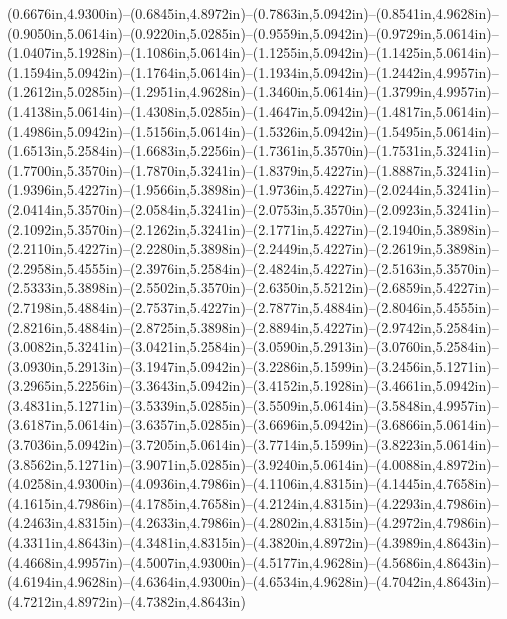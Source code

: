(0.6676in,4.9300in)--(0.6845in,4.8972in)--(0.7863in,5.0942in)--(0.8541in,4.9628in)--(0.9050in,5.0614in)--(0.9220in,5.0285in)--(0.9559in,5.0942in)--(0.9729in,5.0614in)--(1.0407in,5.1928in)--(1.1086in,5.0614in)--(1.1255in,5.0942in)--(1.1425in,5.0614in)--(1.1594in,5.0942in)--(1.1764in,5.0614in)--(1.1934in,5.0942in)--(1.2442in,4.9957in)--(1.2612in,5.0285in)--(1.2951in,4.9628in)--(1.3460in,5.0614in)--(1.3799in,4.9957in)--(1.4138in,5.0614in)--(1.4308in,5.0285in)--(1.4647in,5.0942in)--(1.4817in,5.0614in)--(1.4986in,5.0942in)--(1.5156in,5.0614in)--(1.5326in,5.0942in)--(1.5495in,5.0614in)--(1.6513in,5.2584in)--(1.6683in,5.2256in)--(1.7361in,5.3570in)--(1.7531in,5.3241in)--(1.7700in,5.3570in)--(1.7870in,5.3241in)--(1.8379in,5.4227in)--(1.8887in,5.3241in)--(1.9396in,5.4227in)--(1.9566in,5.3898in)--(1.9736in,5.4227in)--(2.0244in,5.3241in)--(2.0414in,5.3570in)--(2.0584in,5.3241in)--(2.0753in,5.3570in)--(2.0923in,5.3241in)--(2.1092in,5.3570in)--(2.1262in,5.3241in)--(2.1771in,5.4227in)--(2.1940in,5.3898in)--(2.2110in,5.4227in)--(2.2280in,5.3898in)--(2.2449in,5.4227in)--(2.2619in,5.3898in)--(2.2958in,5.4555in)--(2.3976in,5.2584in)--(2.4824in,5.4227in)--(2.5163in,5.3570in)--(2.5333in,5.3898in)--(2.5502in,5.3570in)--(2.6350in,5.5212in)--(2.6859in,5.4227in)--(2.7198in,5.4884in)--(2.7537in,5.4227in)--(2.7877in,5.4884in)--(2.8046in,5.4555in)--(2.8216in,5.4884in)--(2.8725in,5.3898in)--(2.8894in,5.4227in)--(2.9742in,5.2584in)--(3.0082in,5.3241in)--(3.0421in,5.2584in)--(3.0590in,5.2913in)--(3.0760in,5.2584in)--(3.0930in,5.2913in)--(3.1947in,5.0942in)--(3.2286in,5.1599in)--(3.2456in,5.1271in)--(3.2965in,5.2256in)--(3.3643in,5.0942in)--(3.4152in,5.1928in)--(3.4661in,5.0942in)--(3.4831in,5.1271in)--(3.5339in,5.0285in)--(3.5509in,5.0614in)--(3.5848in,4.9957in)--(3.6187in,5.0614in)--(3.6357in,5.0285in)--(3.6696in,5.0942in)--(3.6866in,5.0614in)--(3.7036in,5.0942in)--(3.7205in,5.0614in)--(3.7714in,5.1599in)--(3.8223in,5.0614in)--(3.8562in,5.1271in)--(3.9071in,5.0285in)--(3.9240in,5.0614in)--(4.0088in,4.8972in)--(4.0258in,4.9300in)--(4.0936in,4.7986in)--(4.1106in,4.8315in)--(4.1445in,4.7658in)--(4.1615in,4.7986in)--(4.1785in,4.7658in)--(4.2124in,4.8315in)--(4.2293in,4.7986in)--(4.2463in,4.8315in)--(4.2633in,4.7986in)--(4.2802in,4.8315in)--(4.2972in,4.7986in)--(4.3311in,4.8643in)--(4.3481in,4.8315in)--(4.3820in,4.8972in)--(4.3989in,4.8643in)--(4.4668in,4.9957in)--(4.5007in,4.9300in)--(4.5177in,4.9628in)--(4.5686in,4.8643in)--(4.6194in,4.9628in)--(4.6364in,4.9300in)--(4.6534in,4.9628in)--(4.7042in,4.8643in)--(4.7212in,4.8972in)--(4.7382in,4.8643in) 
